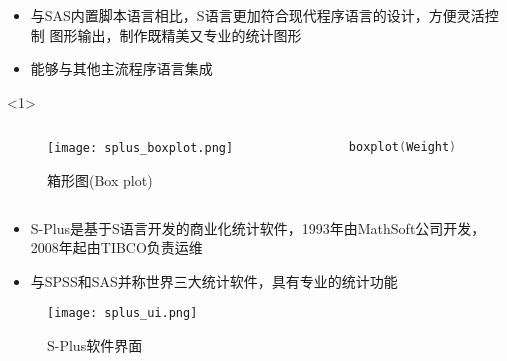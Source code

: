 \begin{frame}[t, fragile]{\subsecname}{\subsubsecname}
    \begin{itemize}
      \item 与SAS内置脚本语言相比，S语言更加符合现代程序语言的设计，方便灵活控制
            图形输出，制作既精美又专业的统计图形
      \item 能够与其他主流程序语言集成
    \end{itemize}

    \begin{onlyenv}<1>
      \begin{columns}
        \begin{column}{.7\textwidth}
          \begin{figure}
            \centering
            \texttt{[image: splus\_boxplot.png]}
            \caption{箱形图(Box plot)}
          \end{figure}
        \end{column}

        \begin{column}{.3\textwidth}
\begin{lstlisting}[language=S]
  boxplot(Weight)
\end{lstlisting}
        \end{column}
      \end{columns}
    \end{onlyenv}
\end{frame}    

\begin{frame}[t]{\subsecname}{\subsubsecname}
    \begin{itemize}
      \item S-Plus是基于S语言开发的商业化统计软件，1993年由MathSoft公司开发，
            2008年起由TIBCO负责运维
      \item 与SPSS和SAS并称世界三大统计软件，具有专业的统计功能
    \end{itemize}

    \begin{figure}
      \centering \texttt{[image: splus\_ui.png]}
      \caption{S-Plus软件界面}
    \end{figure}
\end{frame}    

